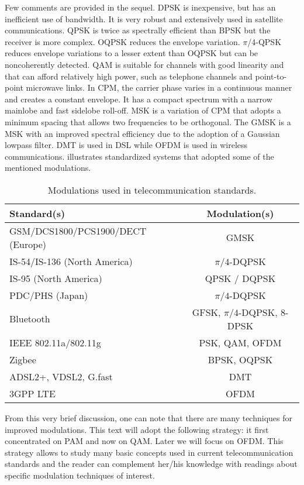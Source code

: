 Few comments are provided in the sequel.
DPSK is inexpensive, but has an inefficient use of bandwidth. It is very robust and extensively used in satellite communications. QPSK is twice as spectrally efficient than BPSK but the receiver is more complex. OQPSK reduces the envelope variation. $\pi$/4-QPSK reduces envelope variations to a lesser extent than OQPSK but can be noncoherently detected.
QAM is suitable for channels with good linearity and that can afford relatively high power, such as telephone channels and point-to-point microwave links. In CPM, the carrier phase varies in a continuous manner and creates a constant envelope. It has a compact spectrum with a narrow mainlobe and fast sidelobe roll-off. MSK is a variation of CPM that adopts a minimum spacing that allows two frequencies to be orthogonal. The GMSK is a MSK with an improved spectral efficiency due to the adoption of a Gaussian lowpass filter.
DMT is used in DSL while OFDM is used in wireless communications.  illustrates standardized systems that adopted some of the mentioned modulations.

\begin{table}
\centering
\caption{Modulations used in telecommunication standards.\label{tab:modulations}}
\begin{tabular}{|l|c|}
\hline
Standard(s) & Modulation(s) \\
\hline
GSM/DCS1800/PCS1900/DECT (Europe) & GMSK \\
IS-54/IS-136 (North America)& $\pi/4$-DQPSK \\
IS-95 (North America) & QPSK / DQPSK \\
PDC/PHS (Japan) &  $\pi/4$-DQPSK \\
Bluetooth & GFSK, $\pi/4$-DQPSK, 8-DPSK \\
IEEE 802.11a/802.11g & PSK, QAM, OFDM\\
Zigbee & BPSK, OQPSK\\
ADSL2+, VDSL2, G.fast & DMT \\
3GPP LTE & OFDM \\
\hline
\end{tabular}
\end{table}

From this very brief discussion, one can note that there are many techniques for improved modulations. This text will adopt the following strategy: it first concentrated on PAM and now on QAM. Later we will focus on OFDM. This strategy allows to study many basic concepts used in current telecommunication standards and the reader can complement her/his knowledge with readings about specific modulation techniques of interest.

